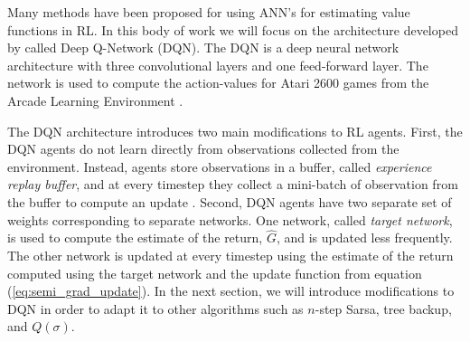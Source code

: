 Many methods have been proposed for using ANN's for estimating value functions in RL.
In this body of work we will focus on the architecture developed by \citeauthor{mnih2015humanlevel} \citeyear{mnih2015humanlevel} called Deep Q-Network (DQN). 
The DQN is a deep neural network architecture with three convolutional layers \parencite{Lecun1989} and one feed-forward layer.
The network is used to compute the action-values for Atari 2600 games from the Arcade Learning Environment \parencite{bellemare13arcade}.

The DQN architecture introduces two main modifications to RL agents. 
First, the DQN agents do not learn directly from observations collected from the environment.
Instead, agents store observations in a buffer, called \textit{experience replay buffer}, and at every timestep they collect a mini-batch of observation from the buffer to compute an update \parencite{Lin1992}.
Second, DQN agents have two separate set of weights corresponding to separate networks.
One network, called \textit{target network}, is used to compute the estimate of the return, $\hat{G}$, and is updated less frequently. 
The other network is updated at every timestep using the estimate of the return computed using the target network and the update function from equation (\ref{eq:semi_grad_update}).
In the next section, we will introduce modifications to DQN in order to adapt it to other algorithms such as $n$-step Sarsa, tree backup, and $Q(\sigma)$.

